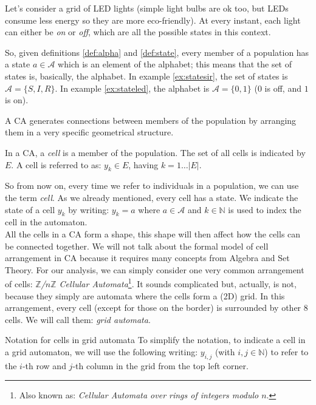 \begin{example}
\label{ex:stateled}
Let's consider a grid of LED lights (simple light bulbs are ok too, but LEDs
consume less energy so they are more eco-friendly). At every instant, each light can either be 
\textit{on} or \textit{off},
which are all the possible states in this context.
\end{example}

So, given definitions \ref{def:alpha} and \ref{def:state}, every member of a population has a state
$a \in \mathcal{A}$ which is an element of the alphabet; this means that the set of states
is, basically, the alphabet.
In example \ref{ex:statesir}, the set of states is $\mathcal{A} = \{ S, I, R \}$. In example
\ref{ex:stateled}, the alphabet is $\mathcal{A} = \{ 0, 1 \}$ ($0$ is off, and $1$ is on).

A CA generates connections between members of the population by arranging them in a very specific
geometrical structure.

\begin{definition}[Cell]
\label{def:cell}
In a CA, a \textit{cell} is a member of the population. The set of all cells is indicated by $E$. A cell
is referred to as: $y_k \in E$, having $k = 1 \dots |E|$.
\end{definition}

So from now on, every time we refer to individuals in a population, we can use the term \textit{cell}.
As we already mentioned, every cell has a state. We indicate the state of a cell
$y_k$ by writing: $y_k = a$ where $a \in \mathcal{A}$ and $k \in \mathbb{N}$ is used to index the
cell in the automaton.\\

All the cells in a CA form a shape, this shape will then affect how the cells can be connected together.
We will not talk about the formal model of cell arrangement in CA because it requires many concepts from
Algebra and Set Theory. For our analysis, we can simply consider one very common arrangement of cells:
\textit{$\mathbb{Z}$/$n\mathbb{Z}$ Cellular Automata}\footnote{Also known as: 
\textit{Cellular Automata over rings of integers modulo $n$}.}. It sounds complicated but, actually,
is not, because they simply are automata where the cells form a (2D) grid. In this arrangement, every cell 
(except for those on the border) is surrounded by other 8 cells. We will call them: \textit{grid automata}.

\begin{important}{Notation for cells in grid automata}
To simplify the notation, to indicate a cell in a grid automaton, 
we will use the following writing: $y_{i,j}$ (with
$i,j \in \mathbb{N}$) to refer to the $i$-th row and $j$-th column in the grid from the top left corner.
\end{important}

